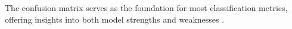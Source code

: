The confusion matrix serves as the foundation for most classification metrics, offering insights into both model strengths and weaknesses \cite{hossin2015review, dalianis2018clinical}.





